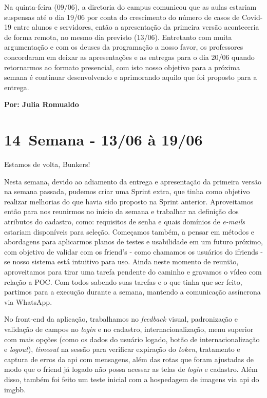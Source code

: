 Na quinta-feira (09/06), a diretoria do campus comunicou que as aulas estariam suspensas até o dia 19/06 por conta do crescimento do número de casos de Covid-19 entre alunos e servidores, então a apresentação da primeira versão aconteceria de forma remota, no mesmo dia previsto (13/06). Entretanto com muita argumentação e com os deuses da programação a nosso favor, os professores concordaram em deixar as apresentações e as entregas para o dia 20/06 quando retornarmos ao formato presencial, com isto nosso objetivo para a próxima semana é continuar desenvolvendo e aprimorando aquilo que foi proposto para a entrega. 

\textbf{Por: Julia Romualdo}

\section{14\textordfeminine \, Semana - 13/06 à 19/06}
Estamos de volta, Bunkers!

Nesta semana, devido ao adiamento da entrega e apresentação da primeira versão na semana passada, pudemos criar uma \gls{Sprint} extra, que tinha como objetivo realizar melhorias do que havia sido proposto na \gls{Sprint} anterior. 
Aproveitamos então para nos reunirmos no início da semana e trabalhar na definição dos atributos do cadastro, como: requisitos de senha e quais domínios de \textit{e-mails} estariam disponíveis para seleção. Começamos também, a pensar em métodos e abordagens para aplicarmos planos de testes e usabilidade em um futuro próximo, com objetivo de validar com os \gls{friend}'s - como chamamos os usuários do \gls{ifriends} - se nosso sistema está intuitivo para uso. Ainda neste momento de reunião, aproveitamos para tirar uma tarefa pendente do caminho e gravamos o vídeo com relação a \acs{POC}. 
Com todos sabendo suas tarefas e o que tinha que ser feito, partimos para a execução durante a semana, mantendo a comunicação assíncrona via \gls{WhatsApp}.

No \gls{front-end} da aplicação, trabalhamos no \textit{feedback} visual, padronização e validação de campos no \textit{login} e no cadastro, internacionalização, menu superior com mais opções (como os dados do usuário logado, botão de internacionalização e \textit{logout}), \textit{timeout} na sessão para verificar expiração do \textit{token}, tratamento e captura de erros da \acs{api} com mensagens, além das rotas que foram ajustadas de modo que o \gls{friend} já logado não possa acessar as telas de \textit{login} e cadastro. Além disso, também foi feito um teste inicial com a hospedagem de imagens via \acs{api} do \gls{imgbb}.

